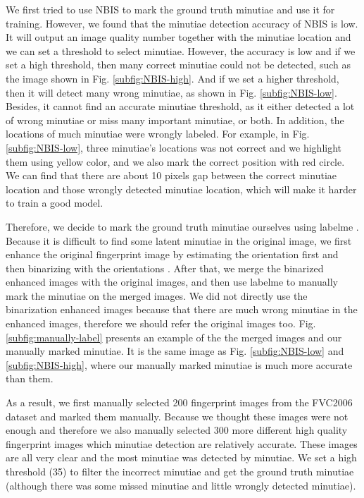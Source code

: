 We first tried to use NBIS \cite{NBIS} to mark the ground truth minutiae and use it for training.
However, we found that the minutiae detection accuracy of NBIS is low.
It will output an image quality number together with the minutiae location and we can set a threshold to select minutiae.
However, the accuracy is low and if we set a high threshold, then many correct minutiae could not be detected, such as the image shown in Fig. \ref{subfig:NBIS-high}.
And if we set a higher threshold, then it will detect many wrong minutiae, as shown in Fig. \ref{subfig:NBIS-low}.
Besides, it cannot find an accurate minutiae threshold, as it either detected a lot of wrong minutiae or miss many important minutiae, or both.
In addition, the locations of much minutiae were wrongly labeled.
For example, in Fig. \ref{subfig:NBIS-low}, three minutiae's locations was not correct and we highlight them using yellow color, and we also mark the correct position with red circle.
We can find that there are about 10 pixels gap between the correct minutiae location and those wrongly detected minutiae location, which will make it harder to train a good model.

Therefore, we decide to mark the ground truth minutiae ourselves using labelme \cite{labelme}.
Because it is difficult to find some latent minutiae in the original image, we first enhance the original fingerprint image by estimating the orientation first and then binarizing with the orientations \cite{caoFingerprintImageEnhancement2017}.
After that, we merge the binarized enhanced images with the original images, and then use labelme to manually mark the minutiae on the merged images.
We did not directly use the binarization enhanced images because that there are much wrong minutiae in the enhanced images, therefore we should refer the original images too.
Fig. \ref{subfig:manually-label} presents an example of the the merged images and our manually marked minutiae.
It is the same image as Fig. \ref{subfig:NBIS-low} and \ref{subfig:NBIS-high}, where our manually marked minutiae is much more accurate than them.

As a result, we first manually selected 200 fingerprint images from the FVC2006 dataset \cite{FVC2006} and marked them manually.
Because we thought these images were not enough and therefore we also manually selected 300 more different high quality fingerprint images which minutiae detection are relatively accurate.
These images are all very clear and the most minutiae was detected by minutiae.
We set a high threshold (35) to filter the incorrect minutiae and get the ground truth minutiae (although there was some missed minutiae and little wrongly detected minutiae).


